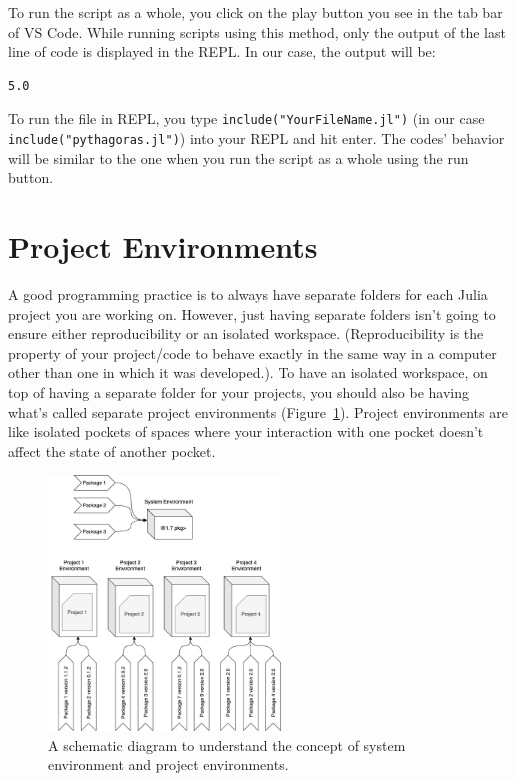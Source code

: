 \documentclass[
  letterpaper,
]{book}
\begin{document}
To run the script as a whole, you click on the play button you see in
the tab bar of VS Code. While running scripts using this method, only
the output of the last line of code is displayed in the REPL. In our
case, the output will be:

\begin{verbatim}
5.0
\end{verbatim}

To run the file in REPL, you type \texttt{include("YourFileName.jl")}
(in our case \texttt{include("pythagoras.jl")}) into your REPL and hit
enter. The codes' behavior will be similar to the one when you run the
script as a whole using the run button.

\hypertarget{project-environments}{%
\section{Project Environments}\label{project-environments}}

A good programming practice is to always have separate folders for each
Julia project you are working on. However, just having separate folders
isn't going to ensure either reproducibility or an isolated workspace.
(Reproducibility is the property of your project/code to behave exactly
in the same way in a computer other than one in which it was
developed.). To have an isolated workspace, on top of having a separate
folder for your projects, you should also be having what's called
separate project environments (Figure~\ref{fig-proj_env}). Project
environments are like isolated pockets of spaces where your interaction
with one pocket doesn't affect the state of another pocket.

\begin{figure}

{\centering \includegraphics[width=0.55\textwidth,height=\textheight]{./images/project_env.jpg}

}

\caption{\label{fig-proj_env}A schematic diagram to understand the
concept of system environment and project environments.}

\end{figure}
\end{document}
